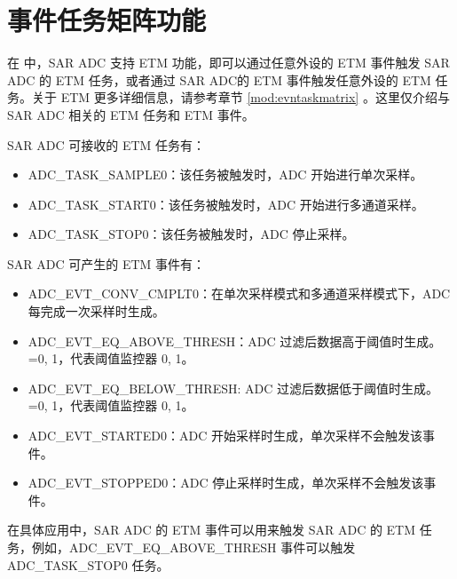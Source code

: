 \documentclass[main\_\_CN.tex]{subfiles}
\begin{document}

\section{事件任务矩阵功能}
\label{sec:adc-etm-func}

在 \chipname{} 中，SAR ADC 支持 ETM 功能，即可以通过任意外设的 ETM 事件触发 SAR ADC 的 ETM 任务，或者通过 SAR ADC的 ETM 事件触发任意外设的 ETM 任务。关于 ETM 更多详细信息，请参考章节 \ref{mod:evntaskmatrix} 。这里仅介绍与 SAR ADC 相关的 ETM 任务和 ETM 事件。

SAR ADC 可接收的 ETM 任务有：

\begin{itemize}
    \item ADC\_TASK\_SAMPLE0：该任务被触发时，ADC 开始进行单次采样。
    \item ADC\_TASK\_START0：该任务被触发时，ADC 开始进行多通道采样。
    \item ADC\_TASK\_STOP0：该任务被触发时，ADC 停止采样。
\end{itemize}

SAR ADC 可产生的 ETM 事件有：

\begin{itemize}
    \item ADC\_EVT\_CONV\_CMPLT0：在单次采样模式和多通道采样模式下，ADC 每完成一次采样时生成。
    \item ADC\_EVT\_EQ\_ABOVE\_THRESH：ADC 过滤后数据高于阈值时生成。=0, 1，代表阈值监控器 0, 1。
    \item ADC\_EVT\_EQ\_BELOW\_THRESH: ADC 过滤后数据低于阈值时生成。=0, 1，代表阈值监控器 0, 1。
    \item ADC\_EVT\_STARTED0：ADC 开始采样时生成，单次采样不会触发该事件。
    \item ADC\_EVT\_STOPPED0：ADC 停止采样时生成，单次采样不会触发该事件。
\end{itemize}

在具体应用中，SAR ADC 的 ETM 事件可以用来触发 SAR ADC 的 ETM 任务，例如，ADC\_EVT\_EQ\_ABOVE\_THRESH 事件可以触发 ADC\_TASK\_STOP0 任务。


\end{document}
